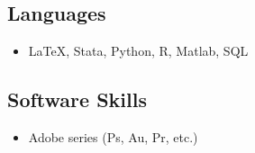\subsection*{Languages}
\begin{itemize}

    \item[] \LaTeX, Stata, Python, R, Matlab, SQL

\end{itemize}


\subsection*{Software Skills}

\begin{itemize}
    \item[] Adobe series (Ps, Au, Pr, etc.)
\end{itemize}

